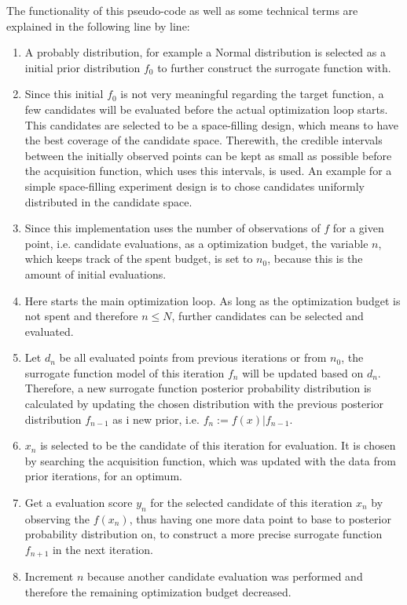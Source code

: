 The functionality of this pseudo-code as well as some technical terms are explained in the following line by line:
\begin{enumerate}
    \item A probably distribution, for example a Normal distribution is selected as a initial prior distribution $f_0$ to further construct the surrogate function with.
    \item Since this initial $f_0$ is not very meaningful regarding the target function, a few candidates will be evaluated before the actual optimization loop starts.
    This candidates are selected to be a space-filling design, which means to have the best coverage of the candidate space.
    Therewith, the credible intervals between the initially observed points can be kept as small as possible before the acquisition function, which uses this intervals, is used.
    An example for a simple space-filling experiment design is to chose candidates uniformly distributed in the candidate space.
    \item Since this implementation uses the number of observations of $f$ for a given point, i.e. candidate evaluations, as a optimization budget, the variable $n$, which keeps track of the spent budget, is set to $n_0$, because this is the amount of initial evaluations.
    \item Here starts the main optimization loop.
    As long as the optimization budget is not spent and therefore $n \leq N$, further candidates can be selected and evaluated.
    \item Let $d_n$ be all evaluated points from previous iterations or from $n_0$, the surrogate function model of this iteration $f_n$ will be updated based on $d_n$.
    Therefore, a new surrogate function posterior probability distribution is calculated by updating the chosen distribution with the previous posterior distribution $f_{n-1}$ as i new prior, i.e. $f_n := f(x)|f_{n-1}$.
    \item $x_n$ is selected to be the candidate of this iteration for evaluation. It is chosen by searching the acquisition function, which was updated with the data from prior iterations, for an optimum.
    \item Get a evaluation score $y_n$ for the selected candidate of this iteration $x_n$ by observing the $f(x_n)$, thus having one more data point to base to posterior probability distribution on, to construct a more precise surrogate function $f_{n+1}$ in the next iteration.
    \item Increment $n$ because another candidate evaluation was performed and therefore the remaining optimization budget decreased.

\end{enumerate}
